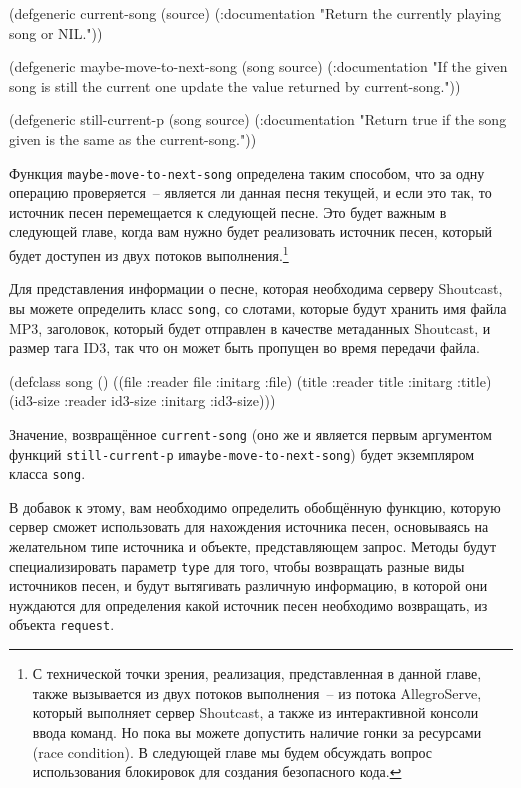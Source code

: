 \begin{myverb}
(defgeneric current-song (source)
  (:documentation "Return the currently playing song or NIL."))

(defgeneric maybe-move-to-next-song (song source)
  (:documentation
   "If the given song is still the current one update the value
returned by current-song."))

(defgeneric still-current-p (song source)
  (:documentation
   "Return true if the song given is the same as the current-song."))
\end{myverb}

Функция \lstinline{maybe-move-to-next-song} определена таким способом, что за одну операцию
проверяется~-- является ли данная песня текущей, и если это так, то источник песен
перемещается к следующей песне.  Это будет важным в следующей главе, когда вам нужно будет
реализовать источник песен, который будет доступен из двух потоков выполнения.\footnote{С
  технической точки зрения, реализация, представленная в данной главе, также вызывается из
  двух потоков выполнения~-- из потока AllegroServe, который выполняет сервер Shoutcast, а
  также из интерактивной консоли ввода команд.  Но пока вы можете допустить наличие гонки
  за ресурсами (race condition).  В следующей главе мы будем обсуждать вопрос
  использования блокировок для создания безопасного кода.}

Для представления информации о песне, которая необходима серверу Shoutcast, вы можете
определить класс \lstinline{song}, со слотами, которые будут хранить имя файла MP3, заголовок,
который будет отправлен в качестве метаданных Shoutcast, и размер тага ID3, так что он
может быть пропущен во время передачи файла.

\begin{myverb}
(defclass song ()
  ((file     :reader file     :initarg :file)
   (title    :reader title    :initarg :title)
   (id3-size :reader id3-size :initarg :id3-size)))
\end{myverb}

Значение, возвращённое \lstinline{current-song} (оно же и является первым аргументом функций
\lstinline{still-current-p} и\lstinline{maybe-move-to-next-song}) будет экземпляром класса
\lstinline{song}.

В добавок к этому, вам необходимо определить обобщённую функцию, которую сервер сможет
использовать для нахождения источника песен, основываясь на желательном типе источника и
объекте, представляющем запрос.  Методы будут специализировать параметр \lstinline{type} для
того, чтобы возвращать разные виды источников песен, и будут вытягивать различную
информацию, в которой они нуждаются для определения какой источник песен необходимо
возвращать, из объекта \lstinline{request}.

